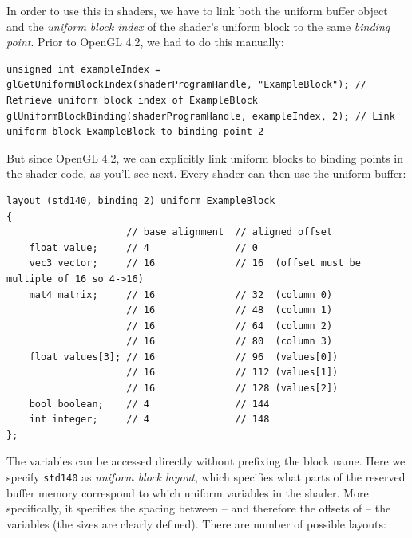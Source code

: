 \documentclass[table, xcdraw]{article}%
\begin{document}
In order to use this in shaders, we have to link both the uniform buffer object and the \emph{uniform block index} of the shader's uniform block to the same \emph{binding point}. Prior to OpenGL 4.2, we had to do this manually:

\begin{verbatim}
unsigned int exampleIndex = glGetUniformBlockIndex(shaderProgramHandle, "ExampleBlock"); // Retrieve uniform block index of ExampleBlock
glUniformBlockBinding(shaderProgramHandle, exampleIndex, 2); // Link uniform block ExampleBlock to binding point 2
\end{verbatim}

But since OpenGL 4.2, we can explicitly link uniform blocks to binding points in the shader code, as you'll see next. Every shader can then use the uniform buffer:

\begin{verbatim}
layout (std140, binding 2) uniform ExampleBlock
{
                     // base alignment  // aligned offset
    float value;     // 4               // 0 
    vec3 vector;     // 16              // 16  (offset must be multiple of 16 so 4->16)
    mat4 matrix;     // 16              // 32  (column 0)
                     // 16              // 48  (column 1)
                     // 16              // 64  (column 2)
                     // 16              // 80  (column 3)
    float values[3]; // 16              // 96  (values[0])
                     // 16              // 112 (values[1])
                     // 16              // 128 (values[2])
    bool boolean;    // 4               // 144
    int integer;     // 4               // 148
};
\end{verbatim}

The variables can be accessed directly without prefixing the block name. Here we specify \texttt{std140} as \emph{uniform block layout}, which specifies what parts of the reserved buffer memory correspond to which uniform variables in the shader. More specifically, it specifies the spacing between -- and therefore the offsets of -- the variables (the sizes are clearly defined). There are number of possible layouts:
\end{document}
